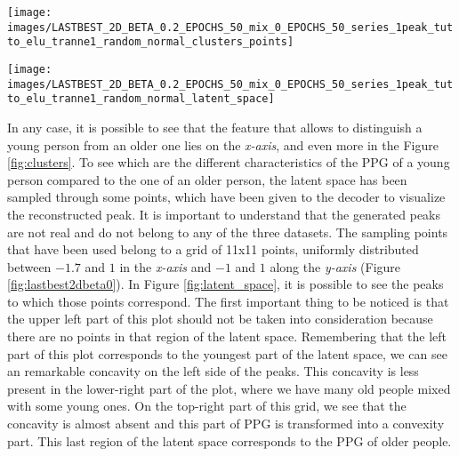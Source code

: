 \documentclass[12pt,a4paper,twocolumn]{article}
\begin{document}
			\begin{figure*}[h!]
				\centering
				\texttt{[image: images/LASTBEST\_2D\_BETA\_0.2\_EPOCHS\_50\_mix\_0\_EPOCHS\_50\_series\_1peak\_tutto\_elu\_tranne1\_random\_normal\_clusters\_points]}
				\caption{Latent space and, in black, the points give to the decoder in order to obtain the plots present in Figure \ref{fig:latent_space}.}
				\label{fig:lastbest2dbeta0}
			\end{figure*}
			\begin{figure*}[h!]
				\centering
				\texttt{[image: images/LASTBEST\_2D\_BETA\_0.2\_EPOCHS\_50\_mix\_0\_EPOCHS\_50\_series\_1peak\_tutto\_elu\_tranne1\_random\_normal\_latent\_space]}
				\caption{In this Figure are shown the peaks that have been generated by sampling the latent space in points distributed on a grid between $-1.7$ and $1$ in the \emph{x-axis} and $-1$ and $1$ along the \emph{y-axis}. Between the brackets there are the coordinates of the sampled points in the latent space. The top-left part of this grid  should not be considered. In the bottom-left we can find the generated PPG near, in the latent space, to young people's PPGs. In the bottom-left part, there is a region in which we have PPG near to both young and old people, while in the top-right part, there is  a region near to the old people's PPG.}
				\label{fig:latent_space}
			\end{figure*}
			In any case, it is possible to see that the feature that allows to distinguish a young person from an older one lies on the \emph{x-axis}, and even more in the Figure \ref{fig:clusters}. To see which are the different characteristics of the PPG of a young person compared to the one of an older person, the latent space has been sampled through some points, which have been given to the decoder to visualize the reconstructed peak. It is important to understand that the generated peaks are not real and do not belong to any of the three datasets. The sampling points that have been used belong to a grid of 11x11 points, uniformly distributed between $-1.7$ and $1$ in the \emph{x-axis} and $-1$ and $1$ along the \emph{y-axis} (Figure  \ref{fig:lastbest2dbeta0}). In Figure \ref{fig:latent_space}, it is possible to see the peaks to which those points correspond. The first important thing to be noticed is that the upper left part of this plot should not be taken into consideration because there are no points in that region of the latent space. Remembering that the left part of this plot corresponds to the youngest part of the latent space, we can see an remarkable concavity on the left side of the peaks. This concavity is less present in the lower-right part of the plot, where we have many old people mixed with some young ones. On the top-right part of this grid, we see that the concavity is almost absent and this part of PPG is transformed into a convexity part. This last region of the latent space corresponds to the PPG of older people.
						
\end{document}
